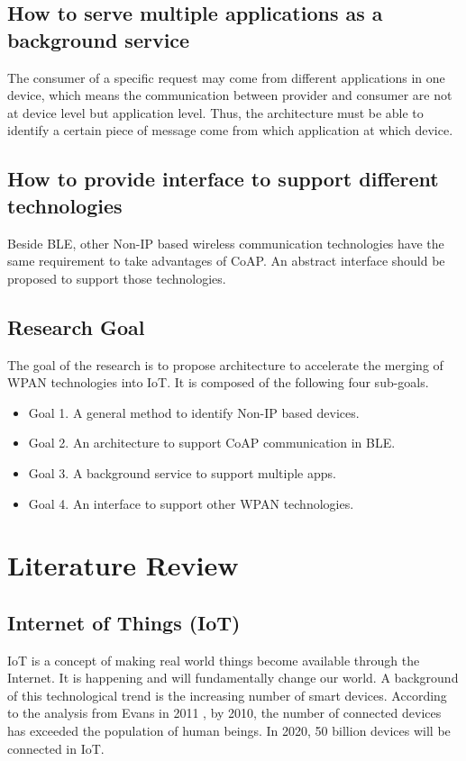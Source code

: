 \documentclass{Nan_Thesis}
\begin{document}
\section{How to serve multiple applications as a background service}
The consumer of a specific request may come from different applications in one device, which means the communication between provider and consumer are not at device level but application level. Thus, the architecture must be able to identify a certain piece of message come from which application at which device.
\section{How to provide interface to support different technologies}
Beside BLE, other Non-IP based wireless communication technologies have the same requirement to take advantages of CoAP. An abstract interface should be proposed to support those technologies.
\section{Research Goal}
The goal of the research is to propose architecture to accelerate the merging of WPAN technologies into IoT. It is composed of the following four sub-goals.

\begin{itemize}
  \item Goal 1. A general method to identify Non-IP based devices.
  \item Goal 2. An architecture to support CoAP communication in BLE.
  \item Goal 3. A background service to support multiple apps.
  \item Goal 4. An interface to support other WPAN technologies.
\end{itemize}

\chapter{Literature Review} 
\section{Internet of Things (IoT)}
IoT is a concept of making real world things become available through the Internet. It is happening and will fundamentally change our world. A background of this technological trend is the increasing number of smart devices. According to the analysis from Evans in 2011 \cite{evans2011IoTtrend}, by 2010, the number of connected devices has exceeded the population of human beings. In 2020, 50 billion devices will be connected in IoT.
\end{document}
